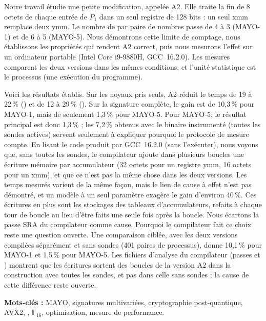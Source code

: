 Notre travail étudie une petite modification, appelée A2. Elle traite la fin de 8 octets de chaque entrée de $P_1$ dans un seul registre de 128 bits : un seul  xmm remplace deux  ymm. Le nombre de  par paire de nombres passe de 4 à 3 (MAYO-1) et de 6 à 5 (MAYO-5). Nous démontrons cette limite de comptage, nous établissons les propriétés qui rendent A2 correct, puis nous mesurons l'effet sur un ordinateur portable (Intel Core i9-9880H, GCC~16.2.0). Les mesures comparent les deux versions dans les mêmes conditions, et l'unité statistique est le processus (une exécution du programme).

Voici les résultats établis. Sur les noyaux pris seuls, A2 réduit le temps de 19 à 22\,\% () et de 12 à 29\,\% (). Sur la signature complète, le gain est de 10,3\,\% pour MAYO-1, mais de seulement 1,3\,\% pour MAYO-5. Pour MAYO-5, le résultat principal est donc 1,3\,\% ; les 7,2\,\% obtenus avec le binaire instrumenté (toutes les sondes actives) servent seulement à expliquer pourquoi le protocole de mesure compte. En lisant le code produit par GCC~16.2.0 (sans l'exécuter), nous voyons que, sans toutes les sondes, le compilateur ajoute dans plusieurs boucles une écriture mémoire par accumulateur (32 octets pour un registre ymm, 16 octets pour un xmm), et que ce n'est pas la même chose dans les deux versions. Les temps mesurés varient de la même façon, mais le lien de cause à effet n'est pas démontré, et un modèle à un seul paramètre exagère le gain d'environ 40\,\%. Ces écritures en plus sont les stockages des tableaux d'accumulateurs, refaits à chaque tour de boucle au lieu d'être faits une seule fois après la boucle. Nous écartons la passe SRA du compilateur comme cause. Pourquoi le compilateur fait ce choix reste une question ouverte. Une comparaison ciblée, avec les deux versions compilées séparément et sans sondes (401 paires de processus), donne 10,1\,\% pour MAYO-1 et 1,5\,\% pour MAYO-5. Les fichiers d'analyse du compilateur (passes  et ) montrent que les écritures sortent des boucles de la version A2 dans la construction avec toutes les sondes, et pas dans celle sans sondes ; la cause de cette différence reste ouverte.

\medskip
\noindent\textbf{Mots-clés :} MAYO, signatures multivariées, cryptographie post-quantique, AVX2, , $\mathbb{F}_{16}$, optimisation, mesure de performance.
